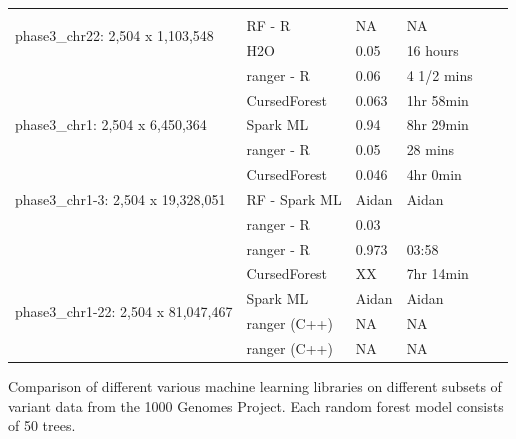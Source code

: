 \documentclass[10pt,letterpaper]{article}
\newcommand{\cursedforest}{{\sc CursedForest}}
\begin{document}
\begin{table}[!ht]
\begin{minipage}{\textwidth}
\begin{tabular}{|l|l|l|l|l|l||}
 \hline
\multirow{3}{*}{phase3\_chr22: 2,504 x 1,103,548}   &               &            &                  \\
                                                    & RF - R        & NA         & NA                \\
                                                    & H2O           & 0.05       & 16 hours         \\
                                                    & ranger - R    & 0.06       & 4 1/2 mins     \\
\hline
\multirow{3}{*}{phase3\_chr1: 2,504 x 6,450,364}    & \cursedforest\ & 0.063  & 1hr 58min         \\
                                                    & Spark ML  & 0.94       & 8hr 29min        \\
                                                    & ranger - R      &  0.05       & 28 mins         \\
\hline
\multirow{3}{*}{phase3\_chr1-3: 2,504 x 19,328,051} & \cursedforest\ & 0.046  & 4hr 0min               \\
                                                    & RF - Spark ML  &    Aidan         &   Aidan               \\
                                                    & ranger - R      & 0.03      &         \\
& ranger - R        &             0.973     &      03:58           \\
\hline

\multirow{4}{*}{phase3\_chr1-22: 2,504 x 81,047,467} & \cursedforest\ & XX  & 7hr 14min \\
& Spark ML & Aidan & Aidan  \\
& ranger (C++)       &        NA     &        NA      \\
& ranger (C++)       &        NA     &        NA    \\
\hline
\end{tabular}
\begin{flushleft} 
Comparison of different various machine learning libraries on different subsets of variant data 
from the 1000 Genomes Project.
Each random forest model consists of 50 trees.
\end{flushleft}
\label{table1}
\end{minipage}
\end{table}

\end{document}
